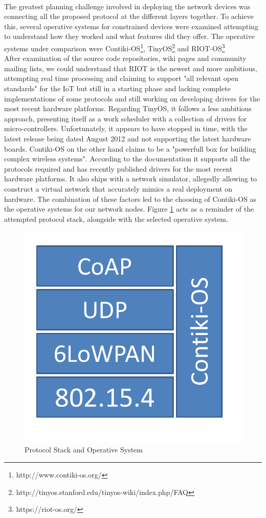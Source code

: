 \paragraph{}
The greatest planning challenge involved in deploying the network devices was connecting all the proposed protocol at the different layers together. To achieve this, several operative systems for constrained devices were examined attempting to understand how they worked and what features did they offer. The operative systems under comparison were Contiki-OS\footnote{http://www.contiki-os.org/}, TinyOS\footnote{http://tinyos.stanford.edu/tinyos-wiki/index.php/FAQ} and RIOT-OS\footnote{https://riot-os.org/}\\
After examination of the source code repositories, wiki pages and community mailing lists, we could understand that RIOT is the newest and more ambitious, attempting real time processing and claiming to support "all relevant open standards" for the \gls{IoT} but still in a starting phase and lacking complete implementations of some protocols and still working on developing drivers for the most recent hardware platforms. Regarding TinyOS, it follows a less ambitious approach, presenting itself as a work scheduler with a collection of drivers for micro-controllers. Unfortunately, it appears to have stopped in time, with the latest release being dated August 2012 and not supporting the latest hardware boards. Contiki-OS on the other hand claims to be a "powerfull box for building complex wireless systems". According to the documentation it supports all the protocols required and has recently published drivers for the most recent hardware platforms. It also ships with a network simulator, allegedly allowing to construct a virtual network that accurately mimics a real deployment on hardware. The combination of these factors led to the choosing of Contiki-OS as the operative systems for our network nodes. Figure \ref{fig:stack_operative_system} acts as a reminder of the attempted protocol stack, alongside with the selected operative system.\\

\begin{figure}[h]
  \centering
  \includegraphics[width=0.3\linewidth]{figures/Stack.pdf}
  \caption{Protocol Stack and Operative System}
  \label{fig:stack_operative_system}
\end{figure}

